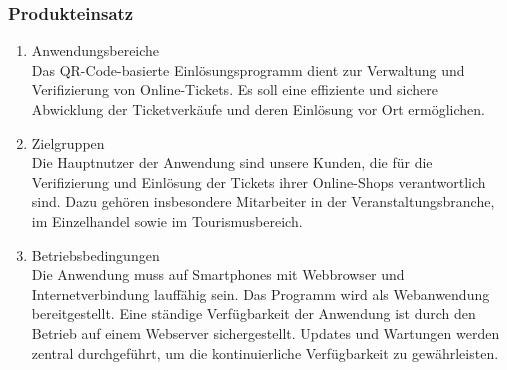 \subsubsection*{Produkteinsatz}

\begin{enumerate}[itemsep=0em,partopsep=0em,parsep=0em,topsep=0em]
    \item Anwendungsbereiche\\
    Das QR-Code-basierte Einlösungsprogramm dient zur Verwaltung und Verifizierung von Online-Tickets. Es soll eine effiziente und sichere Abwicklung der Ticketverkäufe und deren Einlösung vor Ort ermöglichen.

    \item Zielgruppen\\
    Die Hauptnutzer der Anwendung sind unsere Kunden, die für die Verifizierung und Einlösung der Tickets ihrer Online-Shops verantwortlich sind. Dazu gehören insbesondere Mitarbeiter in der Veranstaltungsbranche, im Einzelhandel sowie im Tourismusbereich.

    \item Betriebsbedingungen\\
    Die Anwendung muss auf Smartphones mit Webbrowser und Internetverbindung lauffähig sein. Das Programm wird als Webanwendung bereitgestellt. Eine ständige Verfügbarkeit der Anwendung ist durch den Betrieb auf einem Webserver sichergestellt. Updates und Wartungen werden zentral durchgeführt, um die kontinuierliche Verfügbarkeit zu gewährleisten.
\end{enumerate}
